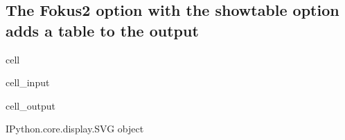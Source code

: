 \documentclass[letterpaper,10pt,english]{jupyterBook}
\begin{document}
\subsection{The Fokus2 option with the showtable option adds a table to the output}
\label{\detokenize{content/06_ModelAnalytics/ModelStructure:the-fokus2-option-with-the-showtable-option-adds-a-table-to-the-output}}
\begin{sphinxuseclass}{cell}\begin{sphinxVerbatimInput}

\begin{sphinxuseclass}{cell_input}
\begin{sphinxVerbatim}[commandchars=\\\{\}]
 
      
\end{sphinxVerbatim}

\end{sphinxuseclass}\end{sphinxVerbatimInput}
\begin{sphinxVerbatimOutput}

\begin{sphinxuseclass}{cell_output}
\begin{sphinxVerbatim}[commandchars=\\\{\}]
\PYGZlt{}IPython.core.display.SVG object\PYGZgt{}
\end{sphinxVerbatim}

\end{sphinxuseclass}\end{sphinxVerbatimOutput}

\end{sphinxuseclass}
\end{document}
